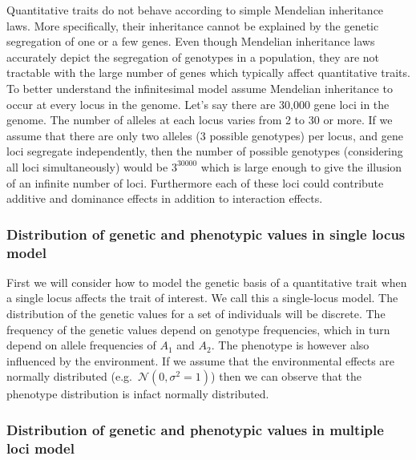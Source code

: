 \documentclass[
]{book}
\newcommand{\N}{\mathcal{N}}
\begin{document}
Quantitative traits do not behave according to simple Mendelian inheritance laws. More specifically, their inheritance cannot be explained by the genetic segregation of one or a few genes. Even though Mendelian inheritance laws accurately depict the segregation of genotypes in a population, they are not tractable with the large number of genes which typically affect quantitative traits. To better understand the infinitesimal model assume Mendelian inheritance to occur at every locus in the genome. Let's say there are 30,000 gene loci in the genome. The number of alleles at each locus varies from 2 to 30 or more. If we assume that there are only two alleles (3 possible genotypes) per locus, and gene loci segregate independently, then the number of possible genotypes (considering all loci simultaneously) would be \(3^{30000}\) which is large enough to give the illusion of an infinite number of loci. Furthermore each of these loci could contribute additive and dominance effects in addition to interaction effects.

\hypertarget{distribution-of-genetic-and-phenotypic-values-in-single-locus-model}{%
\subsubsection{Distribution of genetic and phenotypic values in single locus model}\label{distribution-of-genetic-and-phenotypic-values-in-single-locus-model}}

First we will consider how to model the genetic basis of a quantitative trait when a single locus affects the trait of interest. We call this a single-locus model. The distribution of the genetic values for a set of individuals will be discrete. The frequency of the genetic values depend on genotype frequencies, which in turn depend on allele frequencies of \(A_1\) and \(A_2\). The phenotype is however also influenced by the environment. If we assume that the environmental effects are normally distributed (e.g.~\(\N(0,\sigma^2=1)\)) then we can observe that the phenotype distribution is infact normally distributed.

\hypertarget{distribution-of-genetic-and-phenotypic-values-in-multiple-loci-model}{%
\subsubsection{Distribution of genetic and phenotypic values in multiple loci model}\label{distribution-of-genetic-and-phenotypic-values-in-multiple-loci-model}}
\end{document}
